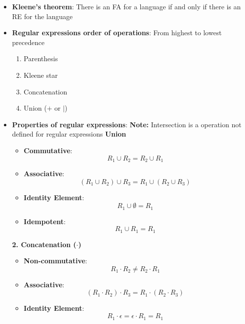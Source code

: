 \documentclass{report}
\begin{document}
\begin{itemize}
        \item \textbf{Kleene's theorem}:
            There is an FA for a language if and only if there is an RE for the language
        \item \textbf{Regular expressions order of operations}: From highest to lowest precedence
            \begin{enumerate}
                \item Parenthesis  
                \item Kleene star
                \item Concatenation
                \item Union ($+$ or $\mid$)
            \end{enumerate}
    \item \textbf{Properties of regular expressions}:
        \bigbreak \noindent 
        \textbf{Note:} Intersection is a operation not defined for regular expressions
        \bigbreak \noindent 
        \textbf{Union}
        \begin{itemize}
            \item \textbf{Commutative}:
                \[
                    R_1 \cup R_2 = R_2 \cup R_1
                \]

            \item \textbf{Associative}:
                \[
                    (R_1 \cup R_2) \cup R_3 = R_1 \cup (R_2 \cup R_3)
                \]

            \item \textbf{Identity Element}:
                \[
                    R_1 \cup \emptyset = R_1
                \]

            \item \textbf{Idempotent}:
                \[
                    R_1 \cup R_1 = R_1
                \]
        \end{itemize}
        \textbf{2. Concatenation (\(\cdot\))}
        \begin{itemize}
            \item \textbf{Non-commutative}:
                \[
                    R_1 \cdot R_2 \neq R_2 \cdot R_1
                \]

            \item \textbf{Associative}:
                \[
                    (R_1 \cdot R_2) \cdot R_3 = R_1 \cdot (R_2 \cdot R_3)
                \]

            \item \textbf{Identity Element}:
                \[
                    R_1 \cdot \epsilon = \epsilon \cdot R_1 = R_1
                \]


\end{itemize}
\end{itemize}
\end{document}
